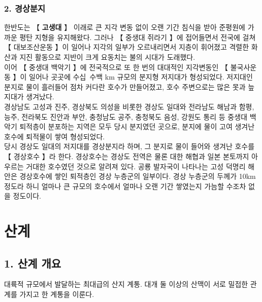 \documentclass[12pt,a4paper]{book}
\newcommand{\SectionMargin}			{\newpage  \null \vskip 0cm}
\begin{document}
\subsection*{2. 경상분지}

한반도는 【 \textbf{고생대} 】 이래로 큰 지각 변동 없이 오랜 기간 침식을 받아 준평원에 가까운 평탄 지형을 유지해왔다. 
그러나 【 중생대 쥐라기 】에 접어들면서 전국에 걸쳐 【 대보조산운동 】이 일어나 지각의 일부가 오르내리면서 지층이 휘어졌고 격렬한 화산과 지진 활동으로 지반이 크게 요동치는 불의 시대가 도래했다.\\

이어 【 중생대 백악기 】에 전국적으로 또 한 번의 대대적인 지각변동인 【 불국사운동 】이 일어나 곳곳에 수십~수백 km 규모의 분지형 저지대가 형성되었다. 저지대인 분지로 물이 흘러들어 점차 커다란 호수가 만들어졌고, 호수 주변으로는 많은 못과 늪지대가 생겨났다.\\

경상남도 고성과 진주, 경상북도 의성을 비롯한 경상도 일대와 전라남도 해남과 함평, 능주, 전라북도 진안과 부안, 충청남도 공주, 충청북도 음성, 강원도 통리 등 중생대 백악기 퇴적층이 분포하는 지역은 모두 당시 분지였던 곳으로, 분지에 물이 고여 생겨난 호수에 퇴적물이 쌓여 형성되었다.\\

당시 경상도 일대의 저지대를 경상분지라 하며, 그 분지로 물이 들어와 생겨난 호수를 【 경상호수 】라 한다. 경상호수는 경상도 전역은 물론 대한 해협과 일본 본토까지 아우르는 거대한 호수였던 것으로 알려져 있다. 공룡 발자국이 나타나는 고성 덕명리 해안은 경상호수에 쌓인 퇴적층인 경상 누층군의 일부이다. 경상 누층군의 두께가 10km 정도라 하니 얼마나 큰 규모의 호수에서 얼마나 오랜 기간 쌓였는지 가늠할 수조차 없을 정도이다.\\





\newpage
\chapter{산계}



	\SectionMargin
	\section{1. 산계 개요}
	\null


	대륙적 규모에서 발달하는 최대급의 산지 계통. 대개 둘 이상의 산맥이 서로 밀접한 관계를 가지고 한 계통을 이룬다.
\end{document}
